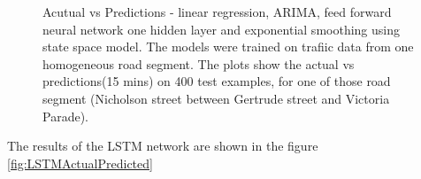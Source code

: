 \begin{figure}[h]
    \qquad

    \caption[Acutual vs Predictions, using currently popular methods]{Acutual vs Predictions -
    linear regression, ARIMA, feed forward neural network one hidden layer and exponential
    smoothing using state space model. The models were trained on trafiic data from one homogeneous
    road segment. The plots show the actual vs predictions(15 mins) on 400 test examples, for one
    of those road segment (Nicholson street between Gertrude street and Victoria Parade).}
    \label{fig:benchmarkModels}
\end{figure}

The results of the LSTM network are shown in the figure \ref{fig:LSTMActualPredicted}

